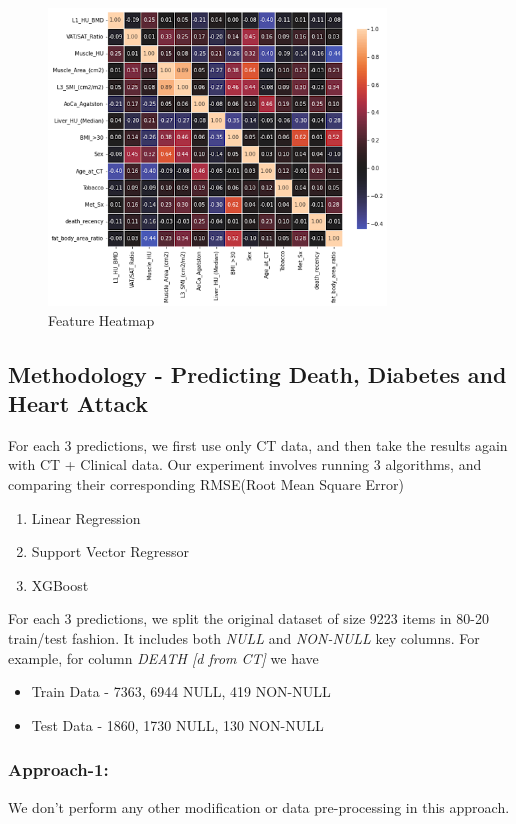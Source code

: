 \begin{figure}[h]
\centering
\includegraphics[width=0.8\textwidth]{images/heatmap.png}
\caption{Feature Heatmap}
\label{fig:heatmap}
\end{figure}

\subsection{Methodology - Predicting Death, Diabetes and Heart Attack}

For each 3 predictions, we first use only CT data, and then take the results again with CT + Clinical data. Our experiment involves running 3 algorithms, and comparing their corresponding RMSE(Root Mean Square Error)
\begin{enumerate}
    \item Linear Regression
    \item Support Vector Regressor
    \item XGBoost
\end{enumerate}

For each 3 predictions, we split the original dataset of size 9223 items in 80-20 train/test fashion. It includes both \textit{NULL} and \textit{NON-NULL} key columns. For example, for column \textit{DEATH [d from CT]} we have
\begin{itemize}
    \item Train Data - 7363, 6944 NULL, 419 NON-NULL
    \item Test Data - 1860, 1730 NULL, 130 NON-NULL
\end{itemize}

\subsubsection{Approach-1:}
We don't perform any other modification or data pre-processing in this approach.

